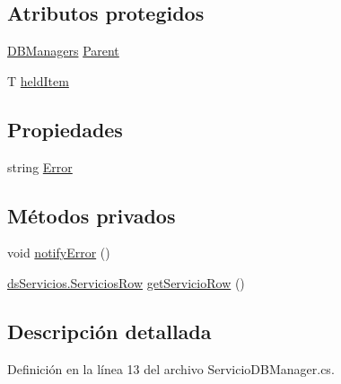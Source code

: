 \subsection*{Atributos protegidos}
\begin{DoxyCompactItemize}
\item 
\hyperlink{class_proyecto___integrador__3_1_1_d_b_managers}{D\-B\-Managers} \hyperlink{class_proyecto___integrador__3_1_1_d_b_managers_1_1_d_b_manager_3_01_t_01_4_a06315e75298c8f2fd46f32dc7c9a80b2}{Parent}
\item 
T \hyperlink{class_proyecto___integrador__3_1_1_d_b_managers_1_1_d_b_manager_3_01_t_01_4_a3b67ae3b5b3b9c3793d56c1407d7dcff}{held\-Item}
\end{DoxyCompactItemize}
\subsection*{Propiedades}
\begin{DoxyCompactItemize}
\item 
string \hyperlink{class_proyecto___integrador__3_1_1_d_b_managers_1_1_d_b_manager_3_01_t_01_4_a6e5caaed2ee1a4d067dfbf5aaa1b1fa8}{Error}
\end{DoxyCompactItemize}
\subsection*{Métodos privados}
\begin{DoxyCompactItemize}
\item 
void \hyperlink{class_proyecto___integrador__3_1_1_d_b_managers_1_1_servicio_d_b_manager_aec27444dd8d35014f241b2b6ab0f83b9}{notify\-Error} ()
\item 
\hyperlink{class_proyecto___integrador__3_1_1ds_servicios_1_1_servicios_row}{ds\-Servicios.\-Servicios\-Row} \hyperlink{class_proyecto___integrador__3_1_1_d_b_managers_1_1_servicio_d_b_manager_ae48a4f63dee1bf94e8a93d7a47586233}{get\-Servicio\-Row} ()
\end{DoxyCompactItemize}


\subsection{Descripción detallada}


Definición en la línea 13 del archivo Servicio\-D\-B\-Manager.\-cs.



